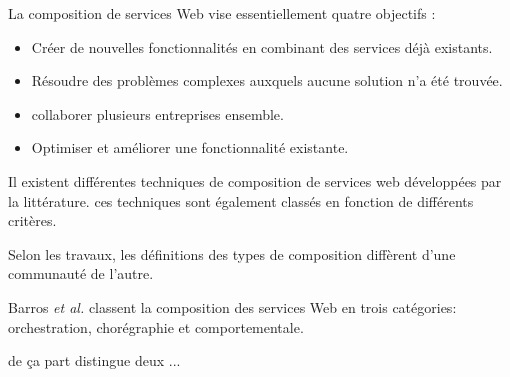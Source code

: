 

    La composition de services Web vise essentiellement quatre
    objectifs \cite{driss2011approche}:
    \begin{itemize}

      \item Créer de nouvelles fonctionnalités en combinant des services
        déjà existants.

      \item Résoudre des problèmes complexes auxquels aucune solution
        n'a été trouvée.

      \item collaborer plusieurs entreprises ensemble.

      \item Optimiser et améliorer une fonctionnalité existante.

    \end{itemize}

    Il existent différentes techniques de composition de services web
    développées par la littérature. ces techniques sont également
    classés en fonction de différents critères.

    Selon les travaux, les définitions des types de composition
    diffèrent d'une communauté de l'autre.

    Barros \emph{et al.} \cite{barros2006standards} classent la
    composition des services Web en trois catégories: orchestration,
    chorégraphie et comportementale.

    \cite{peltz2003web} de ça part distingue deux ...




